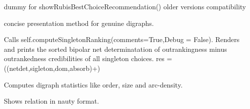 \documentclass[letterpaper,10pt,english]{sphinxmanual}
\begin{document}
\begin{fulllineitems}
\begin{fulllineitems}
\end{fulllineitems}


\begin{fulllineitems}
\label{techDoc:digraphs.Digraph.showRubyChoice}
dummy for showRubisBestChoiceRecommendation()
older versions compatibility

\end{fulllineitems}


\begin{fulllineitems}
\label{techDoc:digraphs.Digraph.showShort}
concise presentation method for genuine digraphs.

\end{fulllineitems}


\begin{fulllineitems}
\label{techDoc:digraphs.Digraph.showSingletonRanking}
Calls self.computeSingletonRanking(comments=True,Debug = False).
Renders and prints the sorted bipolar net determinatation of outrankingness
minus outrankedness credibilities of all singleton choices.
res = ((netdet,sigleton,dom,absorb)+)

\end{fulllineitems}


\begin{fulllineitems}
\label{techDoc:digraphs.Digraph.showStatistics}
Computes digraph statistics like order, size and arc-density.

\end{fulllineitems}


\begin{fulllineitems}
\label{techDoc:digraphs.Digraph.showdre}
Shows relation in nauty format.

\end{fulllineitems}


\end{fulllineitems}
\end{document}
